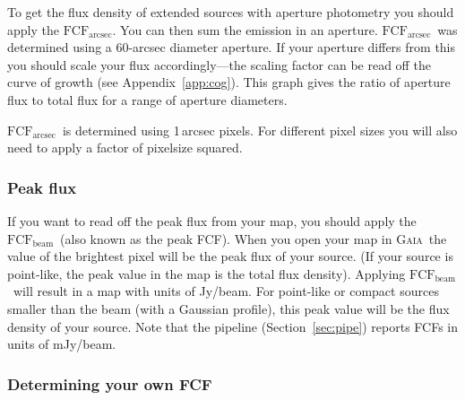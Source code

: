 \documentclass[twoside,11pt]{article}
\newcommand{\htmlref}[2]{#1}
\newcommand{\latexhtml}[2]{#1}
\newcommand{\xref}[3]{#1}
\renewcommand{\_}{\texttt{\symbol{95}}}
\newcommand{\fcfb}{$\mathrm{FCF_{beam}}$}
\newcommand{\fcfa}{$\mathrm{FCF_{arcsec}}$}
\newcommand{\gaia}{\xref{\textsc{Gaia}}{sun214}{}}
\newcommand{\cref}[3]{\latexhtml{#1~\ref{#2}}{\htmlref{#3}{#2}}}
\begin{document}
To get the flux density of extended sources with aperture
photometry you should apply the \fcfa.  You can then sum the emission
in an aperture. \fcfa\ was determined using a 60-arcsec diameter
aperture. If your aperture differs from this you should scale your
flux accordingly---the scaling factor can be read off the curve of
growth (see \cref{Appendix}{app:cog}{this appendix}). This graph gives
the ratio of aperture flux to total flux for a range of aperture diameters.

\fcfa\ is determined using 1\,arcsec pixels. For different pixel sizes
you will also need to apply a factor of pixelsize squared.

\subsubsection{Peak flux}

If you want to read off the peak flux from your map, you should apply
the \fcfb\ (also known as the peak FCF).  When you open your map in
\gaia\ the value of the brightest pixel will be the peak flux of your
source. (If your source is point-like, the peak value in the map is
the total flux density). Applying \fcfb\ will result in a map with
units of Jy/beam. For point-like or compact sources smaller than the
beam (with a Gaussian profile), this peak value will be the flux
density of your source. Note that the pipeline
(\cref{Section}{sec:pipe}{SCUBA-2 Pipeline}) reports FCFs in units of
mJy/beam.

\subsubsection{Determining your own FCF}
\end{document}
